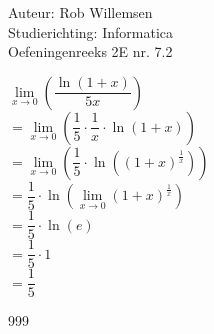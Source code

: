\documentclass[a4paper]{article}
\begin{document}
\noindent \large Auteur: Rob Willemsen \\
\noindent \large Studierichting: Informatica\\
\noindent \large Oefeningenreeks 2E nr. 7.2\\

\medskip

\normalsize

$\lim\limits_{x \rightarrow 0} \left(\dfrac{\ln(1 + x)}{5x}\right)$ \\

$= \lim\limits_{x \rightarrow 0} \left(\dfrac{1}{5} \cdot \dfrac{1}{x} \cdot \ln(1 + x)\right)$ \\

$= \lim\limits_{x \rightarrow 0} \left(\dfrac{1}{5} \cdot \ln\left((1 + x)^{\tfrac{1}{x}}\right)\right)$ \\

$= \dfrac{1}{5} \cdot \ln\left(\lim\limits_{x \rightarrow 0}(1 + x)^{\tfrac{1}{x}}\right)$ \\

$= \dfrac{1}{5} \cdot \ln(e)$ \\

$= \dfrac{1}{5} \cdot 1$ \\

$= \dfrac{1}{5}$ \\

\begin{thebibliography}{999}
\end{thebibliography}
\end{document}
